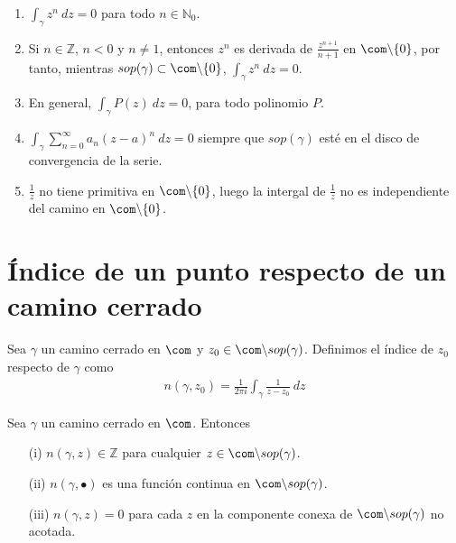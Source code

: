 \begin{ejemplo}
\begin{enumerate}
    \item $\int_{\gamma}{z^n \ dz} = 0$ para todo $n \in \mathbb{N}_0$.
    \item Si $n \in \mathbb{Z}$, $n < 0$ y $n \not = 1$, entonces $z^n$ es derivada de $\frac{z^{n+1}}{n+1}$ en $\com \backslash \{0\}$, por tanto, mientras $sop(\gamma) \subset \com \backslash \{0\}$,  $\int_{\gamma}{z^n \ dz} = 0$.
    \item En general,  $\int_{\gamma}{P(z) \ dz} = 0$, para todo polinomio $P$.
    \item  $\int_{\gamma}{\sum_{n=0}^{\infty}a_n(z-a)^n \ dz} = 0$ siempre que $sop(\gamma)$ esté en el disco de convergencia de la serie.
    \item $\frac{1}{z}$ no tiene primitiva en $\com \backslash \{0\}$, luego la intergal de $\frac{1}{z}$ no es independiente del camino en $\com \backslash \{0\}$.
\end{enumerate}
\end{ejemplo}

\section{Índice de un punto respecto de un camino cerrado}

\begin{defi}
Sea $\gamma$ un camino cerrado en $\com$ y $z_0 \in \com \backslash sop(\gamma)$. Definimos el índice de $z_0$ respecto de $\gamma$ como
\begin{align*}
    n(\gamma,z_0) = \frac{1}{2\pi i}\int_{\gamma}{\frac{1}{z-z_0} \ dz}
\end{align*}
\end{defi}

\begin{teo}
Sea $\gamma$ un camino cerrado en $\com$. Entonces
\begin{enumerate}
    \item[(i)] $n(\gamma,z) \in \mathbb{Z}$ para cualquier $z \in \com \backslash sop(\gamma)$.
    \item[(ii)] $n(\gamma, \bullet)$ es una función continua en $\com \backslash sop(\gamma)$.
    \item[(iii)] $n(\gamma,z) = 0$ para cada $z$ en la componente conexa de $\com \backslash sop(\gamma)$ no acotada.
\end{enumerate}
\end{teo}

